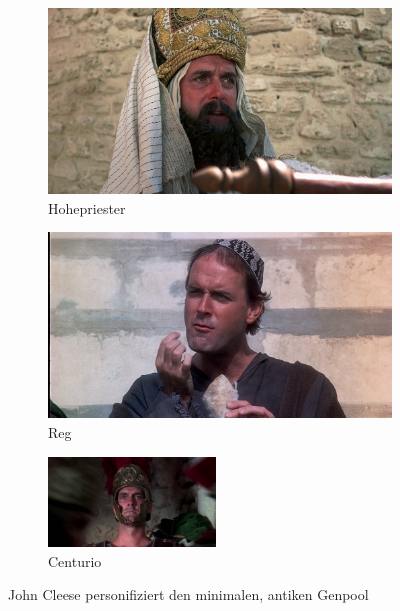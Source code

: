 \documentclass{scrartcl}
\begin{document}
	\begin{figure}[h]
	\begin{subfigure}{.3\textwidth}
		\includegraphics[width=\textwidth]{brian1}
		\caption{Hohepriester}
	\end{subfigure}
	\begin{subfigure}{.3\textwidth}
		\includegraphics[width=\textwidth]{brian2}
		\caption{Reg}
	\end{subfigure}
	\begin{subfigure}{.333\textwidth}
		\includegraphics[width=\textwidth, height=24mm]{brian3}
		\caption{Centurio}
	\end{subfigure}
	\caption{John Cleese personifiziert den minimalen, antiken Genpool}		
    \end{figure}
\end{document}

